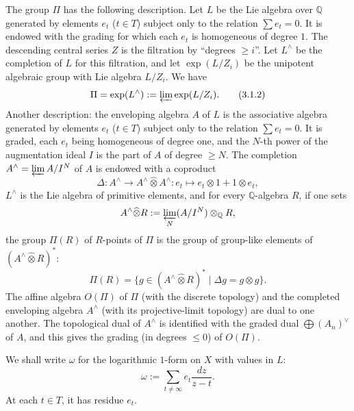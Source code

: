 \documentclass[11pt]{article}
\newcommand{\Q}{\mathbb Q}
\begin{document}
The group $\Pi$ has the following description.
Let $L$ be the Lie algebra over $\Q$ generated by elements $e_t$ ($t\in T$) subject only to the relation $\sum e_t=0$.
It is endowed with the grading for which each $e_t$ is homogeneous of degree $1$.
The descending central series $Z$ is the filtration by ``degrees $\geq i$''.
Let $L^\wedge$ be the completion of $L$ for this filtration, and let $\exp(L/Z_i)$ be the unipotent algebraic group with Lie algebra $L/Z_i$.
We have
\begin{equation}
\Pi=\exp(L^\wedge):=\varprojlim \exp(L/Z_i).
\tag{3.1.2}
\end{equation}
Another description: the enveloping algebra $A$ of $L$ is the associative algebra generated by elements $e_t$ ($t\in T$) subject only to the relation $\sum e_t=0$.
It is graded, each $e_t$ being homogeneous of degree one, and the $N$-th power of the augmentation ideal $I$ is the part of $A$ of degree $\geq N$.
The completion $A^\wedge=\varprojlim A/I^N$ of $A$ is endowed with a coproduct
\[
 \Delta:A^\wedge\to A^\wedge\widehat\otimes A^\wedge:
 e_t\longmapsto e_t\otimes1+1\otimes e_t,
\]
$L^\wedge$ is the Lie algebra of primitive elements, and for every $\Q$-algebra $R$, if one sets
\[
 A^\wedge\widehat\otimes R:=\varprojlim_N (A/I^N)\otimes_\Q R,
\]
the group $\Pi(R)$ of $R$-points of $\Pi$ is the group of group-like elements of $(A^\wedge\widehat\otimes R)^*$:
\begin{equation}
\Pi(R)=\{g\in(A^\wedge\widehat\otimes R)^*\mid \Delta g=g\otimes g\}.
\tag{3.1.3}
\end{equation}
The affine algebra $O(\Pi)$ of $\Pi$ (with the discrete topology) and the completed enveloping algebra $A^\wedge$ (with its projective-limit topology) are dual to one another.
The topological dual of $A^\wedge$ is identified with the graded dual $\bigoplus(A_n)^\vee$ of $A$, and this gives the grading (in degrees $\leq0$) of $O(\Pi)$.

We shall write $\omega$ for the logarithmic $1$-form on $X$ with values in $L$:
\begin{equation}
 \omega:=\sum_{t\ne\infty} e_t\frac{dz}{z-t}.
\tag{3.1.4}
\end{equation}
At each $t\in T$, it has residue $e_t$.
\end{document}

